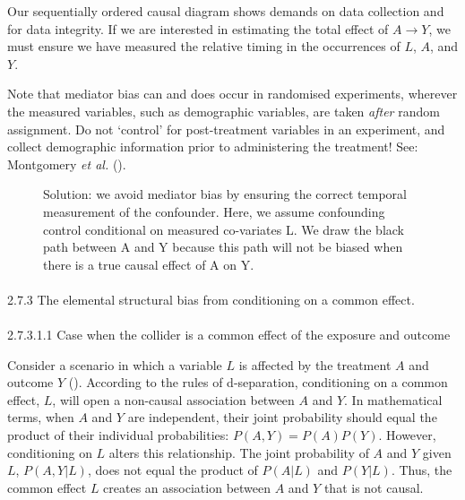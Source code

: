 \documentclass[
  singlecolumn]{article}
\makeatletter
\let\oldparagraph\paragraph
\renewcommand{\paragraph}{
    \@ifstar
      \xxxParagraphStar
      \xxxParagraphNoStar
  }
\newcommand{\xxxParagraphStar}[1]{\oldparagraph*{#1}\mbox{}}
\newcommand{\xxxParagraphNoStar}[1]{\oldparagraph{#1}\mbox{}}
\makeatother
\begin{document}
Our sequentially ordered causal diagram shows demands on data collection
and for data integrity. If we are interested in estimating the total
effect of \(A\to Y\), we must ensure we have measured the relative
timing in the occurrences of \(L\), \(A\), and \(Y\).

Note that mediator bias can and does occur in randomised experiments,
wherever the measured variables, such as demographic variables, are
taken \emph{after} random assignment. Do not `control' for
post-treatment variables in an experiment, and collect demographic
information prior to administering the treatment! See: Montgomery
\emph{et al.} ().

\begin{figure}


\caption{\label{fig-dag-common-effect-solution-2}Solution: we avoid
mediator bias by ensuring the correct temporal measurement of the
confounder. Here, we assume confounding control conditional on measured
co-variates L. We draw the black path between A and Y because this path
will not be biased when there is a true causal effect of A on Y.}

\end{figure}%

\paragraph{2.7.3 The elemental structural bias from conditioning on a
common
effect.}\label{the-elemental-structural-bias-from-conditioning-on-a-common-effect.}

\paragraph{2.7.3.1.1 Case when the collider is a common effect of the
exposure and
outcome}\label{case-when-the-collider-is-a-common-effect-of-the-exposure-and-outcome}

Consider a scenario in which a variable \(L\) is affected by the
treatment \(A\) and outcome \(Y\) (). According to the rules of d-separation, conditioning on a
common effect, \(L\), will open a non-causal association between \(A\)
and \(Y\). In mathematical terms, when \(A\) and \(Y\) are independent,
their joint probability should equal the product of their individual
probabilities: \(P(A, Y) = P(A)P(Y)\). However, conditioning on \(L\)
alters this relationship. The joint probability of \(A\) and \(Y\) given
\(L\), \(P(A, Y | L)\), does not equal the product of \(P(A | L)\) and
\(P(Y | L)\). Thus, the common effect \(L\) creates an association
between \(A\) and \(Y\) that is not causal.
\end{document}
